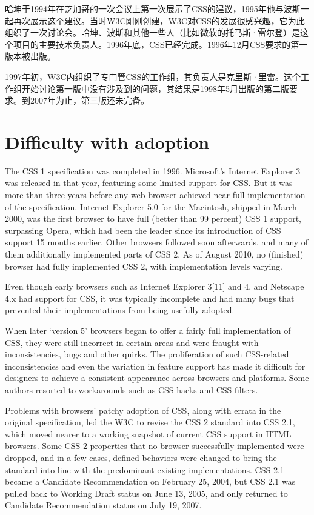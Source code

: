 哈坤于1994年在芝加哥的一次会议上第一次展示了CSS的建议，1995年他与波斯一起再次展示这个建议。当时W3C刚刚创建，W3C对CSS的发展很感兴趣，它为此组织了一次讨论会。哈坤、波斯和其他一些人（比如微软的托马斯·雷尔登）是这个项目的主要技术负责人。1996年底，CSS已经完成。1996年12月CSS要求的第一版本被出版。

1997年初，W3C内组织了专门管CSS的工作组，其负责人是克里斯·里雷。这个工作组开始讨论第一版中没有涉及到的问题，其结果是1998年5月出版的第二版要求。到2007年为止，第三版还未完备。




\section{Difficulty with adoption}


The CSS 1 specification was completed in 1996. Microsoft's Internet Explorer 3 was released in that year, featuring some limited support for CSS. But it was more than three years before any web browser achieved near-full implementation of the specification. Internet Explorer 5.0 for the Macintosh, shipped in March 2000, was the first browser to have full (better than 99 percent) CSS 1 support, surpassing Opera, which had been the leader since its introduction of CSS support 15 months earlier. Other browsers followed soon afterwards, and many of them additionally implemented parts of CSS 2. As of August 2010, no (finished) browser had fully implemented CSS 2, with implementation levels varying.


Even though early browsers such as Internet Explorer 3[11] and 4, and Netscape 4.x had support for CSS, it was typically incomplete and had many bugs that prevented their implementations from being usefully adopted.


When later `version 5' browsers began to offer a fairly full implementation of CSS, they were still incorrect in certain areas and were fraught with inconsistencies, bugs and other quirks. The proliferation of such CSS-related inconsistencies and even the variation in feature support has made it difficult for designers to achieve a consistent appearance across browsers and platforms. Some authors resorted to workarounds such as CSS hacks and CSS filters.

Problems with browsers' patchy adoption of CSS, along with errata in the original specification, led the W3C to revise the CSS 2 standard into CSS 2.1, which moved nearer to a working snapshot of current CSS support in HTML browsers. Some CSS 2 properties that no browser successfully implemented were dropped, and in a few cases, defined behaviors were changed to bring the standard into line with the predominant existing implementations. CSS 2.1 became a Candidate Recommendation on February 25, 2004, but CSS 2.1 was pulled back to Working Draft status on June 13, 2005, and only returned to Candidate Recommendation status on July 19, 2007.


